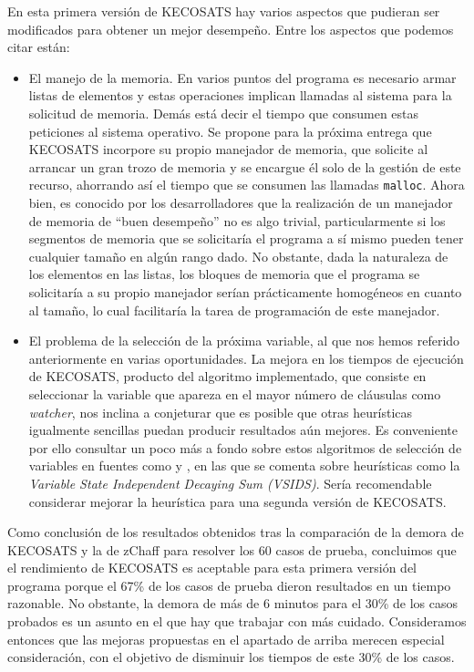 \documentclass[12pt,lettersize,oneside]{article}
\begin{document}
En esta primera versión de KECOSATS hay varios aspectos que pudieran ser
modificados para obtener un mejor desempeño. Entre los aspectos que podemos
citar están:
\begin{itemize}
\item El manejo de la memoria. En varios puntos del programa es necesario armar
  listas de elementos y estas operaciones implican llamadas al sistema para la
  solicitud de memoria. Demás está decir el tiempo que consumen estas peticiones
  al sistema operativo. Se propone para la próxima entrega que KECOSATS
  incorpore su propio manejador de memoria, que solicite al arrancar un gran
  trozo de memoria y se encargue él solo de la gestión de este recurso,
  ahorrando así el tiempo que se consumen las llamadas {\tt malloc}. Ahora bien,
  es conocido por los desarrolladores que la realización de un manejador de
  memoria de ``buen desempeño'' no es algo trivial, particularmente si los
  segmentos de memoria que se solicitaría el programa a sí mismo pueden tener
  cualquier tamaño en algún rango dado. No obstante, dada la naturaleza de los
  elementos en las listas, los bloques de memoria que el programa se solicitaría
  a su propio manejador serían prácticamente homogéneos en cuanto al tamaño, lo
  cual facilitaría la tarea de programación de este manejador.
\item El problema de la selección de la próxima variable, al que nos hemos
  referido anteriormente en varias oportunidades. La mejora en los tiempos de
  ejecución de KECOSATS, producto del algoritmo implementado, que consiste en
  seleccionar la variable que apareza en el mayor número de cláusulas como
  \emph{watcher}, nos inclina a conjeturar que es posible que otras heurísticas
  igualmente sencillas puedan producir resultados aún mejores. Es conveniente
  por ello consultar un poco más a fondo sobre estos algoritmos de selección de
  variables en fuentes como \cite{Zhang} y \cite{ZhangThesis}, en las que se
  comenta sobre heurísticas como la  \emph{Variable State Independent Decaying
    Sum (VSIDS)}. Sería recomendable considerar mejorar la heurística para una
  segunda versión de KECOSATS.
\end{itemize}

Como conclusión de los resultados obtenidos tras la comparación de la demora de
KECOSATS y la de zChaff para resolver los 60 casos de prueba, concluimos que el
rendimiento de KECOSATS es aceptable para esta primera versión del programa
porque el 67\% de los casos de prueba dieron resultados en un tiempo
razonable. No obstante, la demora de más de 6 minutos para el 30\% de los casos
probados es un asunto en el que hay que trabajar con más cuidado. Consideramos
entonces que las mejoras propuestas en el apartado de arriba merecen especial
consideración, con el objetivo de disminuir los tiempos de este 30\% de los
casos.
\end{document}
